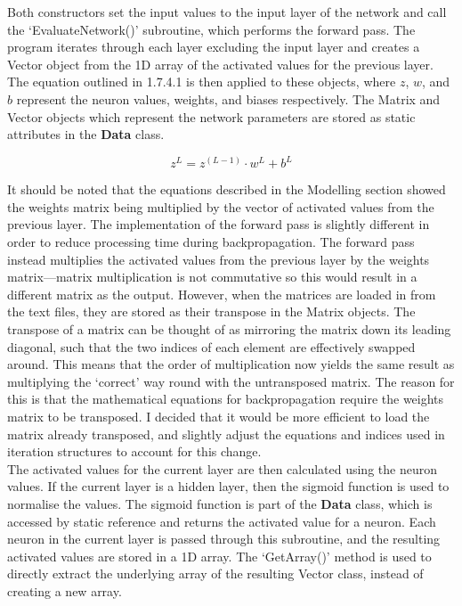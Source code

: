 \documentclass{article}
\begin{document}
Both constructors set the input values to the input layer of the network and call the `EvaluateNetwork()' subroutine, which performs the forward pass. The program iterates through each layer excluding the input layer and creates a Vector object from the 1D array of the activated values for the previous layer. The equation outlined in 1.7.4.1 is then applied to these objects, where \(z\), \(w\), and \(b\) represent the neuron values, weights, and biases respectively. The Matrix and Vector objects which represent the network parameters are stored as static attributes in the \textbf{Data} class.

\begin{equation*}
    z^L=z^{(L-1)}\cdot w^L+b^L
\end{equation*}

It should be noted that the equations described in the Modelling section showed the weights matrix being multiplied by the vector of activated values from the previous layer. The implementation of the forward pass is slightly different in order to reduce processing time during backpropagation. The forward pass instead multiplies the activated values from the previous layer by the weights matrix---matrix multiplication is not commutative so this would result in a different matrix as the output. However, when the matrices are loaded in from the text files, they are stored as their transpose in the Matrix objects. The transpose of a matrix can be thought of as mirroring the matrix down its leading diagonal, such that the two indices of each element are effectively swapped around. This means that the order of multiplication now yields the same result as multiplying the `correct' way round with the untransposed matrix. The reason for this is that the mathematical equations for backpropagation require the weights matrix to be transposed. I decided that it would be more efficient to load the matrix already transposed, and slightly adjust the equations and indices used in iteration structures to account for this change. \\

The activated values for the current layer are then calculated using the neuron values. If the current layer is a hidden layer, then the sigmoid function is used to normalise the values. The sigmoid function is part of the \textbf{Data} class, which is accessed by static reference and returns the activated value for a neuron. Each neuron in the current layer is passed through this subroutine, and the resulting activated values are stored in a 1D array. The `GetArray()' method is used to directly extract the underlying array of the resulting Vector class, instead of creating a new array. \\
\end{document}
